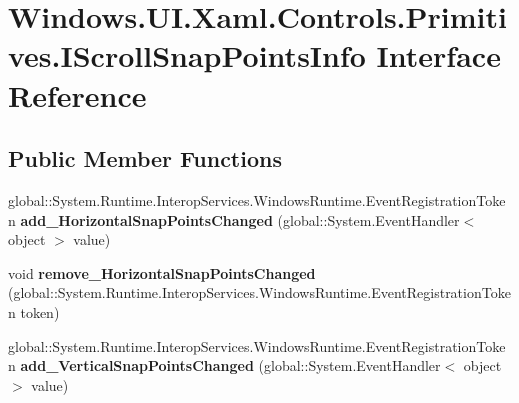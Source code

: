 \hypertarget{interface_windows_1_1_u_i_1_1_xaml_1_1_controls_1_1_primitives_1_1_i_scroll_snap_points_info}{}\section{Windows.\+U\+I.\+Xaml.\+Controls.\+Primitives.\+I\+Scroll\+Snap\+Points\+Info Interface Reference}
\label{interface_windows_1_1_u_i_1_1_xaml_1_1_controls_1_1_primitives_1_1_i_scroll_snap_points_info}
\subsection*{Public Member Functions}
\begin{DoxyCompactItemize}
\item 
\mbox{\label{interface_windows_1_1_u_i_1_1_xaml_1_1_controls_1_1_primitives_1_1_i_scroll_snap_points_info_a821f2a593f07df670bedc1aa736522df}} 
global\+::\+System.\+Runtime.\+Interop\+Services.\+Windows\+Runtime.\+Event\+Registration\+Token {\bfseries add\+\_\+\+Horizontal\+Snap\+Points\+Changed} (global\+::\+System.\+Event\+Handler$<$ object $>$ value)
\item 
\mbox{\label{interface_windows_1_1_u_i_1_1_xaml_1_1_controls_1_1_primitives_1_1_i_scroll_snap_points_info_aa3fb03dbd56b4a79ce2cb3184e76cd1a}} 
void {\bfseries remove\+\_\+\+Horizontal\+Snap\+Points\+Changed} (global\+::\+System.\+Runtime.\+Interop\+Services.\+Windows\+Runtime.\+Event\+Registration\+Token token)
\item 
\mbox{\label{interface_windows_1_1_u_i_1_1_xaml_1_1_controls_1_1_primitives_1_1_i_scroll_snap_points_info_a571d9a77feb356614085f5bd5c61164d}} 
global\+::\+System.\+Runtime.\+Interop\+Services.\+Windows\+Runtime.\+Event\+Registration\+Token {\bfseries add\+\_\+\+Vertical\+Snap\+Points\+Changed} (global\+::\+System.\+Event\+Handler$<$ object $>$ value)
\item 
\mbox{\label{interface_windows_1_1_u_i_1_1_xaml_1_1_controls_1_1_primitives_1_1_i_scroll_snap_points_info_aa8b329ace55d867384797aed3c99571d}} 

\end{DoxyCompactItemize}
